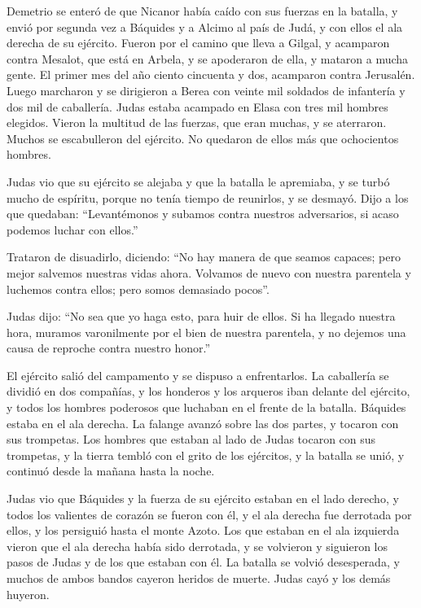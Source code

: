 Demetrio se enteró de que Nicanor había caído con sus
fuerzas en la batalla, y envió por segunda vez a Báquides y a Alcimo al
país de Judá, y con ellos el ala derecha de su ejército. 
Fueron por el camino que lleva a Gilgal, y acamparon contra Mesalot, que
está en Arbela, y se apoderaron de ella, y mataron a mucha gente.
 El primer mes del año ciento cincuenta y dos, acamparon
contra Jerusalén.  Luego marcharon y se dirigieron a Berea
con veinte mil soldados de infantería y dos mil de caballería.
 Judas estaba acampado en Elasa con tres mil hombres
elegidos.  Vieron la multitud de las fuerzas, que eran
muchas, y se aterraron. Muchos se escabulleron del ejército. No quedaron
de ellos más que ochocientos hombres.

 Judas vio que su ejército se alejaba y que la batalla le
apremiaba, y se turbó mucho de espíritu, porque no tenía tiempo de
reunirlos, y se desmayó.  Dijo a los que quedaban:
``Levantémonos y subamos contra nuestros adversarios, si acaso podemos
luchar con ellos.''

 Trataron de disuadirlo, diciendo: ``No hay manera de que
seamos capaces; pero mejor salvemos nuestras vidas ahora. Volvamos de
nuevo con nuestra parentela y luchemos contra ellos; pero somos
demasiado pocos''.

 Judas dijo: ``No sea que yo haga esto, para huir de
ellos. Si ha llegado nuestra hora, muramos varonilmente por el bien de
nuestra parentela, y no dejemos una causa de reproche contra nuestro
honor.''

 El ejército salió del campamento y se dispuso a
enfrentarlos. La caballería se dividió en dos compañías, y los honderos
y los arqueros iban delante del ejército, y todos los hombres poderosos
que luchaban en el frente de la batalla.  Báquides estaba
en el ala derecha. La falange avanzó sobre las dos partes, y tocaron con
sus trompetas.  Los hombres que estaban al lado de Judas
tocaron con sus trompetas, y la tierra tembló con el grito de los
ejércitos, y la batalla se unió, y continuó desde la mañana hasta la
noche.

 Judas vio que Báquides y la fuerza de su ejército
estaban en el lado derecho, y todos los valientes de corazón se fueron
con él,  y el ala derecha fue derrotada por ellos, y los
persiguió hasta el monte Azoto.  Los que estaban en el
ala izquierda vieron que el ala derecha había sido derrotada, y se
volvieron y siguieron los pasos de Judas y de los que estaban con él.
 La batalla se volvió desesperada, y muchos de ambos
bandos cayeron heridos de muerte.  Judas cayó y los demás
huyeron.

